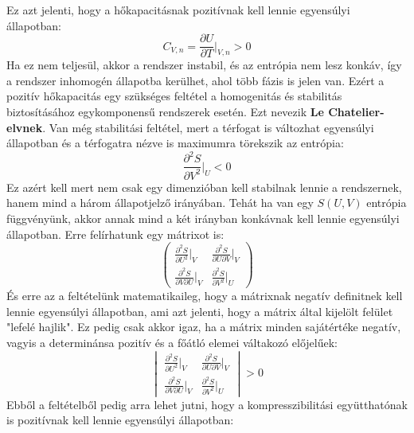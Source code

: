 \documentclass[a4paper,12pt]{article}
\begin{document}
Ez azt jelenti, hogy a hőkapacitásnak pozitívnak kell lennie egyensúlyi állapotban:
\begin{equation}
    C_{V,n} = \frac{\partial U}{\partial T}\bigg|_{V,n} > 0
\end{equation}
Ha ez nem teljesül, akkor a rendszer instabil, és az entrópia nem lesz konkáv, így a rendszer inhomogén állapotba kerülhet, ahol több fázis is jelen van.
Ezért a pozitív hőkapacitás egy szükséges feltétel a homogenitás és stabilitás biztosításához egykomponensű rendszerek esetén. Ezt nevezik \textbf{Le Chatelier-elvnek}.
\newline
\newline
Van még stabilitási feltétel, mert a térfogat is változhat egyensúlyi állapotban és a térfogatra nézve is maximumra törekszik az entrópia:
\begin{equation}
    \frac{\partial^2 S}{\partial V^2}\bigg|_{U} < 0
\end{equation}
Ez azért kell mert nem csak egy dimenzióban kell stabilnak lennie a rendszernek, hanem mind a három állapotjelző irányában.
Tehát ha van egy $S(U, V)$ entrópia függvényünk, akkor annak mind a két irányban konkávnak kell lennie egyensúlyi állapotban. Erre felírhatunk egy mátrixot is:
\begin{equation}
    \begin{pmatrix}
    \frac{\partial^2 S}{\partial U^2}\big|_{V} & \frac{\partial^2 S}{\partial U \partial V}\big|_{V} \\
    \frac{\partial^2 S}{\partial V \partial U}\big|_{V} & \frac{\partial^2 S}{\partial V^2}\big|_{U}
    \end{pmatrix}
\end{equation}
És erre az a feltételünk matematikaileg, hogy a mátrixnak negatív definitnek kell lennie egyensúlyi állapotban, ami azt jelenti, hogy a mátrix által kijelölt
felület "lefelé hajlik". Ez pedig csak akkor igaz, ha a mátrix minden sajátértéke negatív, vagyis a determinánsa pozitív és a főátló elemei váltakozó előjelűek:
\begin{equation}
    \begin{vmatrix}
    \frac{\partial^2 S}{\partial U^2}\big|_{V} & \frac{\partial^2 S}{\partial U \partial V}\big|_{V} \\
    \frac{\partial^2 S}{\partial V \partial U}\big|_{V} & \frac{\partial^2 S}{\partial V^2}\big|_{U}
    \end{vmatrix} > 0
\end{equation}
Ebből a feltételből pedig arra lehet jutni, hogy a kompresszibilitási együtthatónak is pozitívnak kell lennie egyensúlyi állapotban:
\end{document}
